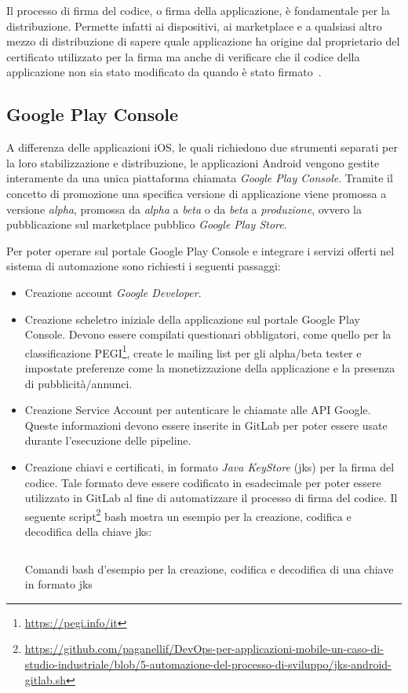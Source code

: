 Il processo di firma del codice, o firma della applicazione, è fondamentale per la distribuzione. Permette infatti ai dispositivi, ai marketplace e a qualsiasi altro mezzo di distribuzione di sapere quale applicazione ha origine dal proprietario del certificato utilizzato per la firma ma anche di verificare che il codice della applicazione non sia stato modificato da quando è stato firmato~\cite{mednieks2011programming}.

\subsection{Google Play Console}
A differenza delle applicazioni iOS, le quali richiedono due strumenti separati per la loro stabilizzazione e distribuzione, le applicazioni Android vengono gestite interamente da una unica piattaforma chiamata \textit{Google Play Console}. Tramite il concetto di promozione una specifica versione di applicazione viene promossa a versione \textit{alpha}, promossa da \textit{alpha} a \textit{beta} o da \textit{beta} a \textit{produzione}, ovvero la pubblicazione sul marketplace pubblico \textit{Google Play Store}.

Per poter operare sul portale Google Play Console e integrare i servizi offerti nel sistema di automazione sono richiesti i seguenti passaggi:
\begin{itemize}
    \item Creazione account \textit{Google Developer}.
    \item Creazione scheletro iniziale della applicazione sul portale Google Play Console. Devono essere compilati questionari obbligatori, come quello per la classificazione PEGI\footnote{\href{https://pegi.info/it}{https://pegi.info/it}}, create le mailing list per gli alpha/beta tester e impostate preferenze come la monetizzazione della applicazione e la presenza di pubblicità/annunci.
    \item Creazione Service Account per autenticare le chiamate alle API Google. Queste informazioni devono essere inserite in GitLab per poter essere usate durante l'esecuzione delle pipeline.
    \item Creazione chiavi e certificati, in formato \textit{Java KeyStore} (jks) per la firma del codice. Tale formato deve essere codificato in esadecimale per poter essere utilizzato in GitLab al fine di automatizzare il processo di firma del codice. Il seguente script\footnote{\href{https://github.com/paganellif/DevOps-per-applicazioni-mobile-un-caso-di-studio-industriale/blob/5-automazione-del-processo-di-sviluppo/jks-android-gitlab.sh}{https://github.com/paganellif/DevOps-per-applicazioni-mobile-un-caso-di-studio-industriale/blob/5-automazione-del-processo-di-sviluppo/jks-android-gitlab.sh}} bash mostra un esempio per la creazione, codifica e decodifica della chiave jks:

    \begin{listing}[H]
        \inputminted{bash}{code/jks-android-gitlab.sh}
        \caption{Comandi bash d'esempio per la creazione, codifica e decodifica di una chiave in formato jks}
    \end{listing}
\end{itemize}

